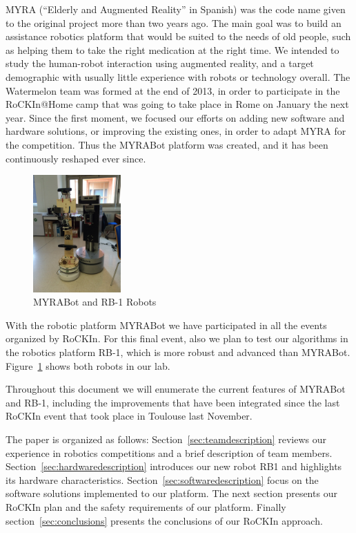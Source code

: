 \documentclass[conference]{IEEEtran}
\begin{document}
MYRA (“Elderly and Augmented Reality” in Spanish) was the code name given to the original
project more than two years ago. The main goal was to build an assistance robotics platform
that would be suited to the needs of old people, such as helping them to take the right
medication at the right time. We intended to study the human-robot interaction using
augmented reality, and a target demographic with usually little experience with robots or
technology overall. The Watermelon team was formed at the end of 2013, in order to
participate in the RoCKIn@Home camp that was going to take place in Rome on January the
next year. Since the first moment, we focused our efforts on adding new software and
hardware solutions, or improving the existing ones, in order to adapt MYRA for the
competition. Thus the MYRABot platform was created, and it has been continuously reshaped
ever since.

\begin{figure}[ht]
  \centering
  \includegraphics[width=0.3\textwidth]{179}
  \caption{MYRABot and RB-1 Robots} 
  \label{fig:robots1}
\end{figure}



With the robotic platform MYRABot we have participated in all the events organized by
RoCKIn. For this final event, also we plan to test our algorithms in the robotics platform
RB-1, which is more robust and advanced than MYRABot. Figure~\ref{fig:robots1} shows both robots in our lab.



Throughout this document we will enumerate the current features of MYRABot and RB-1,
including the improvements that have been integrated since the last RoCKIn event that took
place in Toulouse last November.

The paper is organized as follows: Section~\ref{sec:teamdescription} reviews our experience in robotics competitions and a brief description of team members. Section~\ref{sec:hardwaredescription} introduces our new robot RB1 and highlights its hardware characteristics. Section~\ref{sec:softwaredescription} focus on the software solutions implemented to our platform. The next section presents our RoCKIn plan and the safety requirements of our platform. Finally section~\ref{sec:conclusions} presents the conclusions of our RoCKIn approach. 
\end{document}
